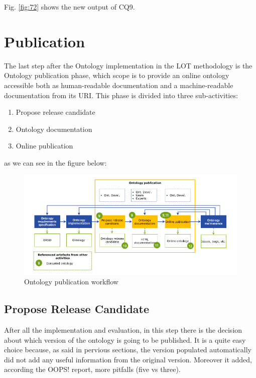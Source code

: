 Fig. \ref{fig:72} shows the new output of CQ9.


\section{Publication}
\label{section:5_5_publication}
The last step after the Ontology implementation in the LOT methodology is the Ontology publication phase, which scope is to provide an online ontology accessible both as human-readable documentation and a machine-readable documentation from its URI.
This phase is divided into three sub-activities:
\begin{enumerate}
    \item Propose release candidate
    \item Ontology documentation
    \item Online publication
\end{enumerate}
as we can see in the figure below:
\begin{figure}[H]
    \centering
    \includegraphics[width=0.9\linewidth]{Figures/fig_25.png}
    \caption{Ontology publication workflow}
    \label{fig:enter-label}
\end{figure}

\subsection{Propose Release Candidate}
\label{subsection:4_5_1_release}
After all the implementation and evaluation, in this step there is the decision about which version of the ontology is going to be published.
It is a quite easy choice because, as said in pervious sections, the version populated automatically did not add any useful information from the original version.
Moreover it added, according the OOPS! report, more pitfalls (five vs three).
